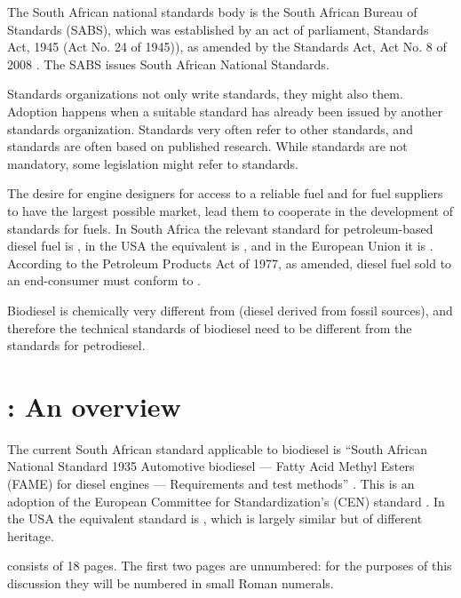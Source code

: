 The South African national standards body is the South African Bureau of
Standards (SABS), which was established by an act of parliament,
 Standards Act, 1945 (Act No. 24 of 1945)), as amended by the Standards Act, Act
 No. 8 of 2008 \autocite{Act8-2008}. The SABS issues South African National
 Standards.

Standards organizations not only write standards, they might also
 them. Adoption happens when a suitable standard has already been
issued by another standards organization. Standards very often refer to other
standards, and standards are often based on published research. While standards
are not mandatory, some legislation might refer to standards.

The desire for engine designers for access to a reliable fuel and for fuel
suppliers to have the largest possible market, lead them to cooperate in the
development of standards for fuels. In South Africa the relevant standard for
petroleum-based diesel fuel is , in the USA the equivalent is
, and in the European Union it is . According to the
Petroleum Products Act of 1977, as amended, diesel fuel sold to an end-consumer
must conform to .

Biodiesel is chemically very different from  (diesel
derived from fossil sources), and therefore the technical standards of biodiesel
need to be different from the standards for petrodiesel.

\section{: An overview}

The current South African standard applicable to biodiesel is ``South African
National Standard 1935 Automotive biodiesel — Fatty Acid Methyl Esters (FAME)
for diesel engines — Requirements and test methods'' \autocite{SANS1935}. This
is an adoption of the European Committee for Standardization's (CEN) standard
 \autocite{EN14214}. In the USA the equivalent standard is
, which is largely similar but of different heritage.

 consists of 18 pages. The first two pages are unnumbered: for
the purposes of this discussion they will be numbered in small Roman numerals.


